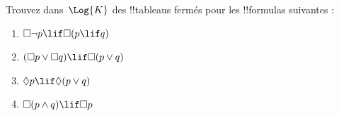 \documentclass[../../../include/open-logic-section]{subfiles}
\begin{document}
\begin{prob}
  Trouvez dans~$\Log{K}$ des !!{tableau}s fermés pour les !!{formula}s suivantes :
  \begin{enumerate}
    \item $\Box \lnot p \lif \Box(p \lif q)$
    \item $(\Box p \lor \Box q) \lif \Box(p \lor q)$
    \item $\Diamond p \lif \Diamond(p \lor q)$
    \item $\Box(p \land q) \lif \Box p$
  \end{enumerate}
\end{prob}
\end{document}
